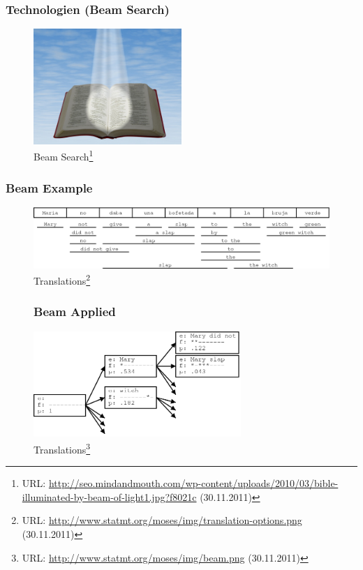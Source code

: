 \documentclass{beamer}
\begin{document}
\begin{frame}
  \frametitle{Technologien (Beam Search)}
  \begin{figure}
  \includegraphics[width=0.50\textwidth]{graphics/beam}
  \caption{Beam Search\footnote{URL: \url{http://seo.mindandmouth.com/wp-content/uploads/2010/03/bible-illuminated-by-beam-of-light1.jpg?f8021c} (30.11.2011)}}
  \end{figure}
\end{frame}
\begin{frame}
  \frametitle{Beam Example}
  \begin{figure}
  \includegraphics[width=1.00\textwidth]{graphics/translationoptions}
  \caption{Translations\footnote{URL:
      \url{http://www.statmt.org/moses/img/translation-options.png} (30.11.2011)}}
  \end{figure}
\end{frame}
\begin{frame}
  \begin{figure}
  \frametitle{Beam Applied}
  \includegraphics[width=0.70\textwidth]{graphics/beam_applied}
  \caption{Translations\footnote{URL:
      \url{http://www.statmt.org/moses/img/beam.png} (30.11.2011)}}
  \end{figure}
\end{frame}
\end{document}
